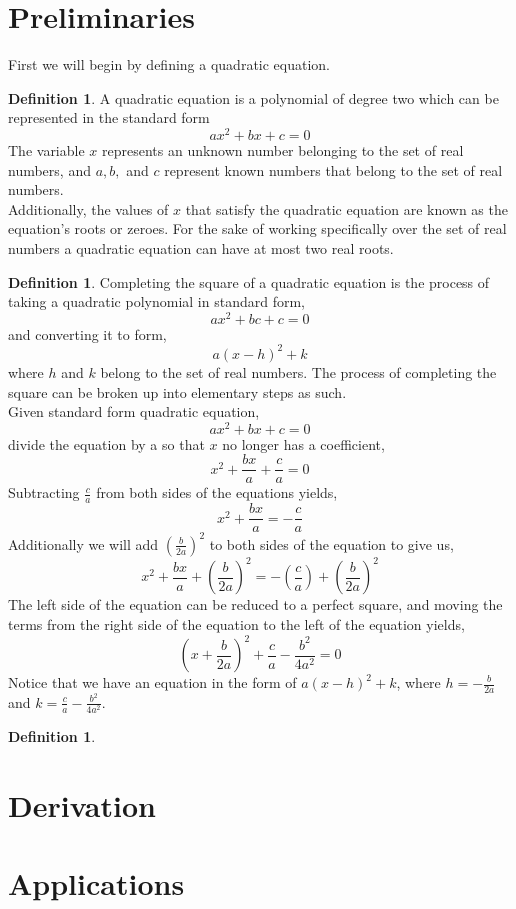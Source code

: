 \documentclass{article}
\theoremstyle{plain}
\theoremstyle{definition}
\newtheorem{defi}[thm]{Definition}
\begin{document}
\section{Preliminaries} \label{sect:prelims}
First we will begin by defining a quadratic equation.
    \begin{defi}\label{def:quadratic}
    A quadratic equation is a polynomial of degree two which can be represented in the standard form\hfill\\
    $$ax^2+bx+c=0$$
    The variable $x$ represents an unknown number belonging to the set of real numbers, and $a, b, $ and $c$ represent known numbers that belong to the set of real numbers.\\
    Additionally, the values of $x$ that satisfy the quadratic equation are known as the equation's roots or zeroes. For the sake of working specifically over the set of real numbers a quadratic equation can have at most two real roots.\\
    \end{defi}
    \begin{defi}\label{def:compSquare}
    Completing the square of a quadratic equation is the process of taking a quadratic polynomial in standard form,\\
    $$ax^2+bc+c=0$$
    and converting it to form,
    $$a(x-h)^2+k$$
    where $h$ and $k$ belong to the set of real numbers.
    The process of completing the square can be broken up into elementary steps as such.\\
    Given standard form quadratic equation, $$ax^2+bx+c=0$$
    divide the equation by a so that $x$ no longer has a coefficient, $$x^2+\frac{bx}{a}+\frac{c}{a}=0$$
    Subtracting $\frac{c}{a}$ from both sides of the equations yields, 
    $$x^2+\frac{bx}{a}=-\frac{c}{a}$$
    Additionally we will add $(\frac{b}{2a})^2$ to both sides of the equation to give us,
    $$x^2+\frac{bx}{a}+(\frac{b}{2a})^2= -(\frac{c}{a}) + (\frac{b}{2a})^2$$
    The left side of the equation can be reduced to a perfect square, and moving the terms from the right side of the equation to the left of the equation yields, 
    $$(x+\frac{b}{2a})^2+\frac{c}{a}-\frac{b^2}{4a^2}=0$$
    Notice that we have an equation in the form of $a(x-h)^2+k$, where $h = -\frac{b}{2a}$ and $k=\frac{c}{a} - \frac{b^2}{4a^2}$.
    \begin{defi}\label{def:quadraticEq}
        
    \end{defi}
    
    
    \end{defi}
\section{Derivation}    \label{sect:derive}

\section{Applications}  \label{sect:application}
\end{document}
